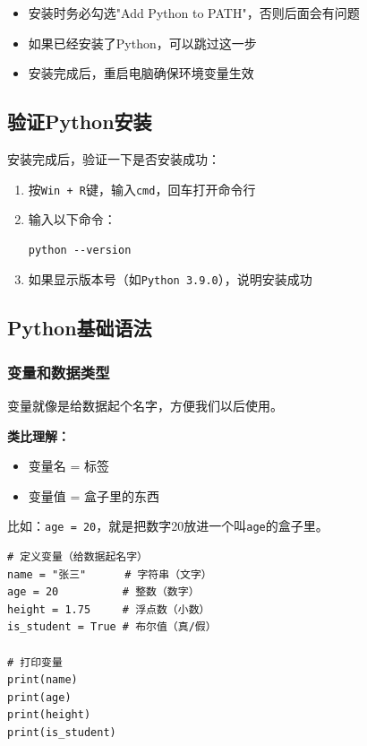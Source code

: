 \documentclass[12pt,a4paper]{article}
\begin{document}
\begin{tipbox}[安装注意事项]
\begin{itemize}
    \item 安装时务必勾选"Add Python to PATH"，否则后面会有问题
    \item 如果已经安装了Python，可以跳过这一步
    \item 安装完成后，重启电脑确保环境变量生效
\end{itemize}
\end{tipbox}

\subsection{验证Python安装}

安装完成后，验证一下是否安装成功：

\begin{enumerate}
    \item 按\texttt{Win + R}键，输入\texttt{cmd}，回车打开命令行
    \item 输入以下命令：
\begin{verbatim}
python --version
\end{verbatim}
    \item 如果显示版本号（如\texttt{Python 3.9.0}），说明安装成功
\end{enumerate}

\subsection{Python基础语法}

\subsubsection{变量和数据类型}

\begin{knowledgebox}
变量就像是给数据起个名字，方便我们以后使用。

\textbf{类比理解：}
\begin{itemize}
    \item 变量名 = 标签
    \item 变量值 = 盒子里的东西
\end{itemize}

比如：\texttt{age = 20}，就是把数字20放进一个叫\texttt{age}的盒子里。
\end{knowledgebox}

\begin{lstlisting}[caption={变量示例}]
# 定义变量（给数据起名字）
name = "张三"      # 字符串（文字）
age = 20          # 整数（数字）
height = 1.75     # 浮点数（小数）
is_student = True # 布尔值（真/假）

# 打印变量
print(name)
print(age)
print(height)
print(is_student)
\end{lstlisting}
\end{document}
